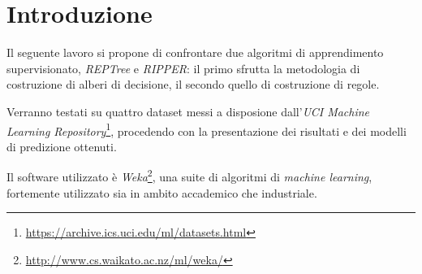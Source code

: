 \chapter{Introduzione}

Il seguente lavoro si propone di confrontare due algoritmi di apprendimento supervisionato, \emph{REPTree} e \emph{RIPPER}: il primo sfrutta la metodologia di costruzione di alberi di decisione, il secondo quello di costruzione di regole.

Verranno testati su quattro dataset messi a disposione dall'\emph{UCI Machine Learning Repository}\footnote{\url{https://archive.ics.uci.edu/ml/datasets.html}}, procedendo con la presentazione dei risultati e dei modelli di predizione ottenuti.

Il software utilizzato è \emph{Weka}\footnote{\url{http://www.cs.waikato.ac.nz/ml/weka/}}, una suite di algoritmi di \textit{machine learning}, fortemente utilizzato sia in ambito accademico che industriale.